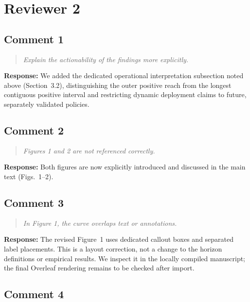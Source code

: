 \documentclass[11pt,a4paper]{article}
\let\originalsubsection\subsection
\renewcommand{\subsection}{\Needspace{9\baselineskip}\originalsubsection}
\let\originalsection\section
\renewcommand{\section}{\Needspace{12\baselineskip}\originalsection}
\newenvironment{reviewcomment}
  {\begin{quote}\itshape}
  {\end{quote}}
\newcommand{\response}{\noindent\textbf{Response:} }
\begin{document}
\section*{Reviewer 2}

\subsection*{Comment 1}

\begin{reviewcomment}
Explain the actionability of the findings more explicitly.
\end{reviewcomment}

\response
We added the dedicated operational interpretation subsection noted above
(Section~3.2), distinguishing the outer positive reach from the longest
contiguous positive interval and restricting dynamic deployment claims to
future, separately validated policies.


\subsection*{Comment 2}

\begin{reviewcomment}
Figures 1 and 2 are not referenced correctly.
\end{reviewcomment}

\response
Both figures are now explicitly introduced and discussed in the main text
(Figs.~1--2).


\subsection*{Comment 3}

\begin{reviewcomment}
In Figure 1, the curve overlaps text or annotations.
\end{reviewcomment}

\response
The revised Figure~1 uses dedicated callout boxes and separated label
placements. This is a layout correction, not a change to the horizon
definitions or empirical results. We inspect it in the locally compiled
manuscript; the final Overleaf rendering remains to be checked after import.


\subsection*{Comment 4}
\end{document}
